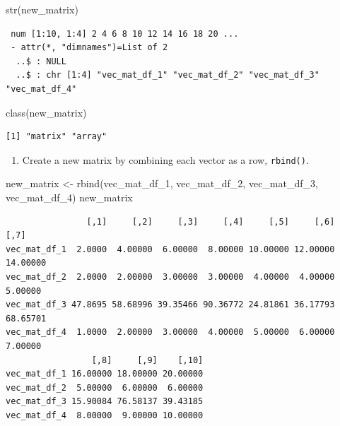 \documentclass[
  letterpaper,
  DIV=11,
  numbers=noendperiod]{scrreprt}
\newenvironment{Shaded}{\begin{snugshade}}{\end{snugshade}}
\newcommand{\FunctionTok}[1]{\textcolor[rgb]{0.28,0.35,0.67}{#1}}
\newcommand{\NormalTok}[1]{\textcolor[rgb]{0.00,0.23,0.31}{#1}}
\newcommand{\OtherTok}[1]{\textcolor[rgb]{0.00,0.23,0.31}{#1}}
\providecommand{\tightlist}{%
  \setlength{\itemsep}{0pt}\setlength{\parskip}{0pt}}\usepackage{longtable,booktabs,array}
\begin{document}
\begin{Shaded}
\begin{Highlighting}[]
\FunctionTok{str}\NormalTok{(new\_matrix)}
\end{Highlighting}
\end{Shaded}

\begin{verbatim}
 num [1:10, 1:4] 2 4 6 8 10 12 14 16 18 20 ...
 - attr(*, "dimnames")=List of 2
  ..$ : NULL
  ..$ : chr [1:4] "vec_mat_df_1" "vec_mat_df_2" "vec_mat_df_3" "vec_mat_df_4"
\end{verbatim}

\begin{Shaded}
\begin{Highlighting}[]
\FunctionTok{class}\NormalTok{(new\_matrix)}
\end{Highlighting}
\end{Shaded}

\begin{verbatim}
[1] "matrix" "array" 
\end{verbatim}

\begin{enumerate}
\def\labelenumi{\arabic{enumi}.}
\setcounter{enumi}{2}
\tightlist
\item
  Create a new matrix by combining each vector as a row,
  \texttt{rbind()}.
\end{enumerate}

\begin{Shaded}
\begin{Highlighting}[]
\NormalTok{new\_matrix }\OtherTok{\textless{}{-}} \FunctionTok{rbind}\NormalTok{(vec\_mat\_df\_1, vec\_mat\_df\_2, vec\_mat\_df\_3, vec\_mat\_df\_4)}
\NormalTok{new\_matrix}
\end{Highlighting}
\end{Shaded}

\begin{verbatim}
                [,1]     [,2]     [,3]     [,4]     [,5]     [,6]     [,7]
vec_mat_df_1  2.0000  4.00000  6.00000  8.00000 10.00000 12.00000 14.00000
vec_mat_df_2  2.0000  2.00000  3.00000  3.00000  4.00000  4.00000  5.00000
vec_mat_df_3 47.8695 58.68996 39.35466 90.36772 24.81861 36.17793 68.65701
vec_mat_df_4  1.0000  2.00000  3.00000  4.00000  5.00000  6.00000  7.00000
                 [,8]     [,9]    [,10]
vec_mat_df_1 16.00000 18.00000 20.00000
vec_mat_df_2  5.00000  6.00000  6.00000
vec_mat_df_3 15.90084 76.58137 39.43185
vec_mat_df_4  8.00000  9.00000 10.00000
\end{verbatim}
\end{document}
